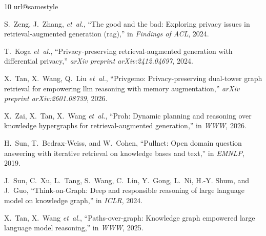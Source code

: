 \documentclass[conference,compsoc,letterpaper]{IEEEtran}
\theoremstyle{definition}
\theoremstyle{remark}
\begin{document}
\clearpage
\begingroup
\def\IEEEbibitemsep{0.15\baselineskip plus 0.05\baselineskip minus 0.05\baselineskip}
\begin{thebibliography}{10}
\providecommand{\url}[1]{#1}
\csname url@samestyle\endcsname
\providecommand{\newblock}{\relax}
\providecommand{\bibinfo}[2]{#2}
\providecommand{\BIBentrySTDinterwordspacing}{\spaceskip=0pt\relax}
\providecommand{\BIBentryALTinterwordstretchfactor}{4}
\providecommand{\BIBentryALTinterwordspacing}{\spaceskip=\fontdimen2\font plus
\BIBentryALTinterwordstretchfactor\fontdimen3\font minus
  \fontdimen4\font\relax}
\providecommand{\BIBforeignlanguage}[2]{{%
\expandafter\ifx\csname l@#1\endcsname\relax
\typeout{** WARNING: IEEEtran.bst: No hyphenation pattern has been}%
\typeout{** loaded for the language `#1'. Using the pattern for}%
\typeout{** the default language instead.}%
\else
\language=\csname l@#1\endcsname
\fi
#2}}
\providecommand{\BIBdecl}{\relax}
\BIBdecl

S.~Zeng, J.~Zhang,  \emph{et~al.}, ``The good and the bad: Exploring privacy
  issues in retrieval-augmented generation (rag),'' in \emph{Findings of ACL},
  2024.

T.~Koga \emph{et~al.}, ``Privacy-preserving retrieval-augmented generation with
  differential privacy,'' \emph{arXiv preprint arXiv:2412.04697}, 2024.

X.~Tan, X.~Wang, Q.~Liu \emph{et~al.}, ``Privgemo: Privacy-preserving
  dual-tower graph retrieval for empowering llm reasoning with memory
  augmentation,'' \emph{arXiv preprint arXiv:2601.08739}, 2026.

X.~Zai, X.~Tan, X.~Wang \emph{et~al.}, ``Proh: Dynamic planning and reasoning
  over knowledge hypergraphs for retrieval-augmented generation,'' in
  \emph{WWW}, 2026.

H.~Sun, T.~Bedrax-Weiss, and W.~Cohen, ``Pullnet: Open domain question
  answering with iterative retrieval on knowledge bases and text,'' in
  \emph{EMNLP}, 2019.

J.~Sun, C.~Xu, L.~Tang, S.~Wang, C.~Lin, Y.~Gong, L.~Ni, H.-Y. Shum, and
  J.~Guo, ``{Think-on-Graph}: Deep and responsible reasoning of large language
  model on knowledge graph,'' in \emph{ICLR}, 2024.

X.~Tan, X.~Wang \emph{et~al.}, ``Paths-over-graph: Knowledge graph empowered
  large language model reasoning,'' in \emph{WWW}, 2025.


\end{thebibliography}
\end{document}
